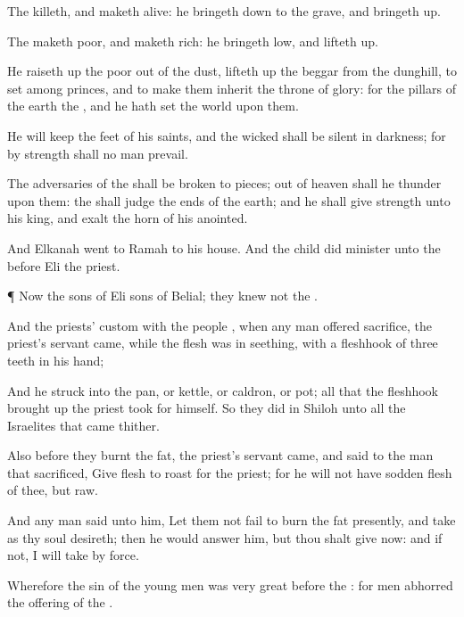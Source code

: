 {The
{}
killeth, and maketh
alive: he bringeth
down to the
grave, and bringeth
up.

The
{} maketh
poor, and maketh
rich: he bringeth
low,
and lifteth
up.

He raiseth
up the
poor out of the
dust,
{} lifteth
up the
beggar from the
dunghill, to
set
{} among
princes, and to make them
inherit the
throne of
glory: for the
pillars of the
earth
{} the
{}, and he hath
set the
world upon them.

He will
keep the
feet of his
saints, and the
wicked shall be
silent in
darkness; for by
strength shall no
man
prevail.

The
adversaries of the
{} shall be broken to
pieces; out of
heaven shall he
thunder upon them: the
{} shall
judge the
ends of the
earth; and he shall
give
strength unto his
king, and
exalt the
horn of his
anointed.


\par }{\PP {}And
Elkanah
went to
Ramah to his
house. And the
child
did
minister unto the
{}
before
Eli the
priest.


\par }{\PP {}¶ Now the
sons of
Eli
{}
sons of
Belial; they
knew not the
{}.

And the
priests’
custom with the
people
{}, when any
man
offered
sacrifice, the
priest’s
servant
came, while the
flesh was in
seething, with a
fleshhook of
three
teeth in his
hand;

And he
struck
{} into the
pan, or
kettle, or
caldron, or
pot; all that the
fleshhook brought
up the
priest
took for himself. So they
did in
Shiloh unto all the
Israelites that
came thither.

Also before they
burnt the
fat, the
priest’s
servant
came, and
said to the
man that
sacrificed,
Give
flesh to
roast for the
priest; for he will not
have
sodden
flesh of thee, but
raw.

And
{} any
man
said unto him, Let them not
fail to
burn the
fat
presently, and
{}
take
{} as thy
soul
desireth; then he would
answer him,
{} but thou shalt
give
{} now: and if not, I will
take
{} by
force.

Wherefore the
sin of the young
men was
very
great
before the
{}: for
men
abhorred the
offering of the
{}.


}
